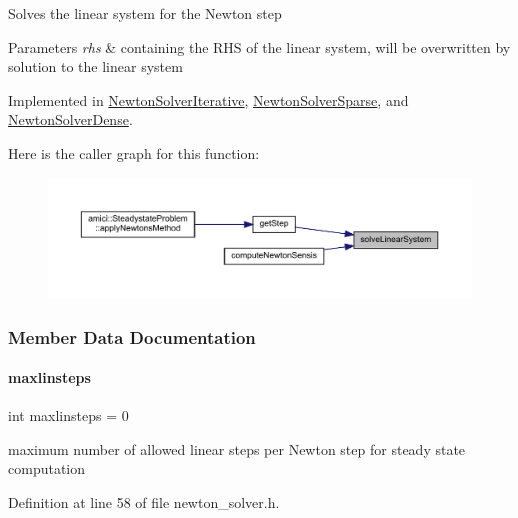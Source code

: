 Solves the linear system for the Newton step


\begin{DoxyParams}{Parameters}
{\em rhs} & containing the R\+HS of the linear system, will be overwritten by solution to the linear system \\
\hline
\end{DoxyParams}


Implemented in \mbox{\hyperlink{classamici_1_1_newton_solver_iterative_aa4a6695d71f00ec1b46e94b33e55660f}{Newton\+Solver\+Iterative}}, \mbox{\hyperlink{classamici_1_1_newton_solver_sparse_aa4a6695d71f00ec1b46e94b33e55660f}{Newton\+Solver\+Sparse}}, and \mbox{\hyperlink{classamici_1_1_newton_solver_dense_aa4a6695d71f00ec1b46e94b33e55660f}{Newton\+Solver\+Dense}}.

Here is the caller graph for this function\+:
\nopagebreak
\begin{figure}[H]
\begin{center}
\leavevmode
\includegraphics[width=350pt]{classamici_1_1_newton_solver_a761a5dc9e8cc7adfd4a392421df17c3d_icgraph}
\end{center}
\end{figure}


\subsubsection{Member Data Documentation}
\mbox{\label{classamici_1_1_newton_solver_a60fddefccade5b1c083c6803c4c49707}} 
\paragraph{\texorpdfstring{maxlinsteps}{maxlinsteps}}
{\footnotesize\ttfamily int maxlinsteps = 0}

maximum number of allowed linear steps per Newton step for steady state computation 

Definition at line 58 of file newton\+\_\+solver.\+h.


